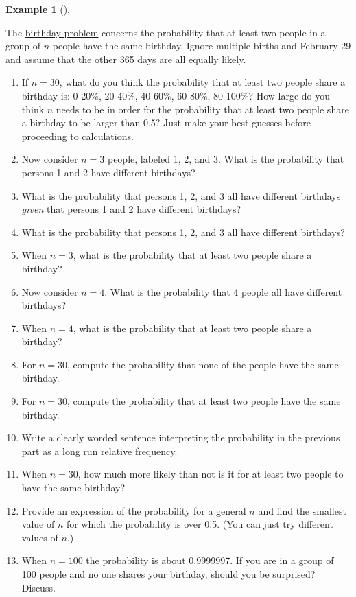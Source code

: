 \documentclass[
  letterpaper,
  DIV=11,
  numbers=noendperiod]{scrreprt}
\providecommand{\tightlist}{%
  \setlength{\itemsep}{0pt}\setlength{\parskip}{0pt}}
\theoremstyle{plain}
\theoremstyle{definition}
\newtheorem{example}{Example}[chapter]
\theoremstyle{definition}
\theoremstyle{definition}
\theoremstyle{remark}
\begin{document}
\begin{tcolorbox}[enhanced jigsaw, opacityback=0, left=2mm, colframe=quarto-callout-note-color-frame, toprule=.15mm, breakable, colback=white, leftrule=.75mm, arc=.35mm, rightrule=.15mm, bottomrule=.15mm]

\begin{example}[]\protect\hypertarget{exm-birthday}{}\label{exm-birthday}

The \href{https://pudding.cool/2018/04/birthday-paradox/}{birthday
problem} concerns the probability that at least two people in a group of
\(n\) people have the same birthday\footnotemark{}. Ignore multiple
births and February 29 and assume that the other 365 days are all
equally likely\footnotemark{}.

\begin{enumerate}
\def\labelenumi{\arabic{enumi}.}
\tightlist
\item
  If \(n=30\), what do you think the probability that at least two
  people share a birthday is: 0-20\%, 20-40\%, 40-60\%, 60-80\%,
  80-100\%? How large do you think \(n\) needs to be in order for the
  probability that at least two people share a birthday to be larger
  than 0.5? Just make your best guesses before proceeding to
  calculations.
\item
  Now consider \(n=3\) people, labeled 1, 2, and 3. What is the
  probability that persons 1 and 2 have different birthdays?
\item
  What is the probability that persons 1, 2, and 3 all have different
  birthdays \emph{given} that persons 1 and 2 have different birthdays?
\item
  What is the probability that persons 1, 2, and 3 all have different
  birthdays?
\item
  When \(n = 3\), what is the probability that at least two people share
  a birthday?
\item
  Now consider \(n=4\). What is the probability that 4 people all have
  different birthdays?
\item
  When \(n = 4\), what is the probability that at least two people share
  a birthday?
\item
  For \(n=30\), compute the probability that none of the people have the
  same birthday.
\item
  For \(n=30\), compute the probability that at least two people have
  the same birthday.
\item
  Write a clearly worded sentence interpreting the probability in the
  previous part as a long run relative frequency.
\item
  When \(n=30\), how much more likely than not is it for at least two
  people to have the same birthday?
\item
  Provide an expression of the probability for a general \(n\) and find
  the smallest value of \(n\) for which the probability is over 0.5.
  (You can just try different values of \(n\).)
\item
  When \(n=100\) the probability is about 0.9999997. If you are in a
  group of 100 people and no one shares your birthday, should you be
  surprised? Discuss.
\end{enumerate}


\end{example}
\end{tcolorbox}
\end{document}
